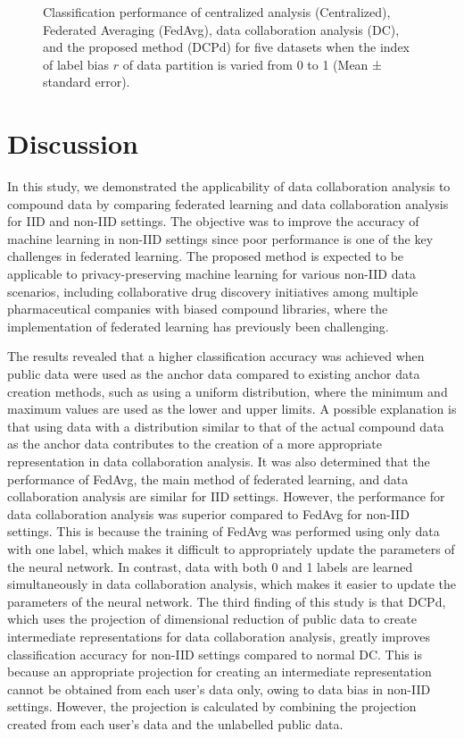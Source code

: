 \documentclass{article}
\begin{document}
\begin{figure}[htbp]
  \caption{Classification performance of centralized analysis (Centralized), Federated Averaging (FedAvg), data collaboration analysis (DC), and the proposed method (DCPd) for five datasets when the index of label bias $r$ of data partition is varied from 0 to 1 (Mean ± standard error). }\label{ラベル}
\end{figure}

\section{Discussion}
\label{sec:sample1}
In this study, we demonstrated the applicability of data collaboration analysis to compound data by comparing federated learning and data collaboration analysis for IID and non-IID settings. The objective was to improve the accuracy of machine learning in non-IID settings since poor performance is one of the key challenges in federated learning. The proposed method is expected to be applicable to privacy-preserving machine learning for various non-IID data scenarios, including collaborative drug discovery initiatives among multiple pharmaceutical companies with biased compound libraries, where the implementation of federated learning has previously been challenging.

The results revealed that a higher classification accuracy was achieved when public data were used as the anchor data compared to existing anchor data creation methods, such as using a uniform distribution, where the minimum and maximum values are used as the lower and upper limits. A possible explanation is that using data with a distribution similar to that of the actual compound data as the anchor data contributes to the creation of a more appropriate representation in data collaboration analysis. It was also determined that the performance of FedAvg, the main method of federated learning, and data collaboration analysis are similar for IID settings. However, the performance for data collaboration analysis was superior compared to FedAvg for non-IID settings. This is because the training of FedAvg was performed using only data with one label, which makes it difficult to appropriately update the parameters of the neural network. In contrast, data with both 0 and 1 labels are learned simultaneously in data collaboration analysis, which makes it easier to update the parameters of the neural network. The third finding of this study is that DCPd, which uses the projection of dimensional reduction of public data to create intermediate representations for data collaboration analysis, greatly improves classification accuracy for non-IID settings compared to normal DC. This is because an appropriate projection for creating an intermediate representation cannot be obtained from each user's data only, owing to data bias in non-IID settings. However, the projection is calculated by combining the projection created from each user’s data and the unlabelled public data.
\end{document}
